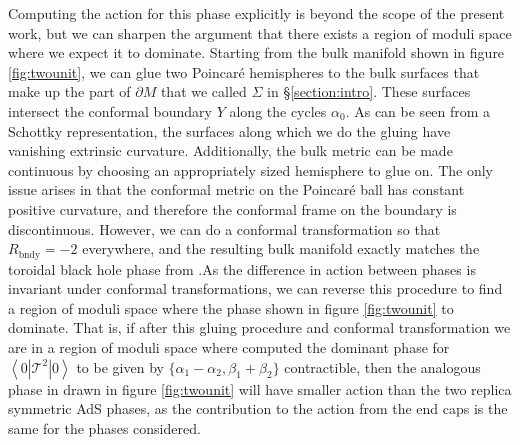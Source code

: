 \documentclass[letterpaper,12pt]{article}
\newcommand{\corr}[1]{\left< #1\right>}
\begin{document}
Computing the action for this phase explicitly is beyond the scope of the present work, but we can sharpen the argument that there exists a region of moduli space where we expect it to dominate. Starting from the bulk manifold shown in figure \ref{fig:twounit}, we can glue two Poincar\'e hemispheres to the bulk surfaces that make up the part of $\partial M$ that we called $\Sigma$ in \S\ref{section:intro}. These surfaces intersect the conformal boundary $Y$ along the cycles $\alpha_0$. As can be seen from a Schottky representation, the surfaces along which we do the gluing have vanishing extrinsic curvature. Additionally, the bulk metric can be made continuous by choosing an appropriately sized hemisphere to glue on. The only issue arises in that the conformal metric on the Poincar\'e ball has constant positive curvature, and therefore the conformal frame on the boundary is discontinuous. However, we can do a conformal transformation so that $R_\text{bndy} = -2$ everywhere, and the resulting bulk manifold exactly matches the toroidal black hole phase from \cite{MRW}.As the difference in action between phases is invariant under conformal transformations, we can reverse this procedure to find a region of moduli space where the phase shown in figure \ref{fig:twounit} to dominate. That is, if after this gluing procedure and conformal transformation we are in a region of moduli space where \cite{MRW} computed the dominant phase for $\corr{0|\mathcal T^2 |0}$ to be given by $\{\alpha_1 -\alpha_2, \beta_1+\beta_2\}$ contractible, then the analogous phase in drawn in figure \ref{fig:twounit} will have smaller action than the two replica symmetric AdS phases, as the contribution to the action from the end caps is the same for the phases considered.
\end{document}
